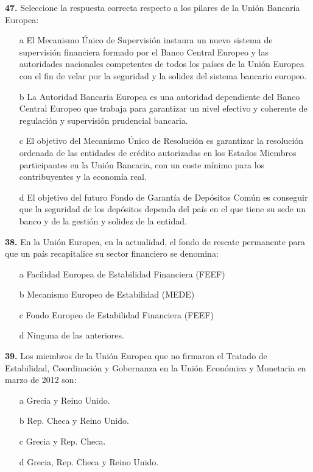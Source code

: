 \documentclass{nuevotema}
\begin{document}
\textbf{47.} Seleccione la respuesta correcta respecto a los pilares de la Unión Bancaria Europea:
\begin{enumerate}
	\item[a] El Mecanismo Único de Supervisión instaura un nuevo sistema de supervisión financiera formado por el Banco Central Europeo y las autoridades nacionales competentes de todos los países de la Unión Europea con el fin de velar por la seguridad y la solidez del sistema bancario europeo.
	\item[b] La Autoridad Bancaria Europea es una autoridad dependiente del Banco Central Europeo que trabaja para garantizar un nivel efectivo y coherente de regulación y supervisión prudencial bancaria.
	\item[c] El objetivo del Mecanismo Único de Resolución es garantizar la resolución ordenada de las entidades de crédito autorizadas en los Estados Miembros participantes en la Unión Bancaria, con un coste mínimo para los contribuyentes y la economía real.
	\item[d] El objetivo del futuro Fondo de Garantía de Depósitos Común es conseguir que la seguridad de los depósitos dependa del país en el que tiene su sede un banco y de la gestión y solidez de la entidad. 
\end{enumerate}


\textbf{38.} En la Unión Europea, en la actualidad, el fondo de rescate permanente para que un país recapitalice su sector financiero se denomina:
\begin{enumerate}
	\item[a] Facilidad Europea de Estabilidad Financiera (FEEF)
	\item[b] Mecanismo Europeo de Estabilidad (MEDE)
	\item[c] Fondo Europeo de Estabilidad Financiera (FEEF)
	\item[d] Ninguna de las anteriores.
\end{enumerate}

\textbf{39.} Los miembros de la Unión Europea que no firmaron el Tratado de Estabilidad, Coordinación y Gobernanza en la Unión Económica y Monetaria en marzo de 2012 son:
\begin{enumerate}
	\item[a] Grecia y Reino Unido.
	\item[b] Rep. Checa y Reino Unido.
	\item[c] Grecia y Rep. Checa.
	\item[d] Grecia, Rep. Checa y Reino Unido.
\end{enumerate}
\end{document}
